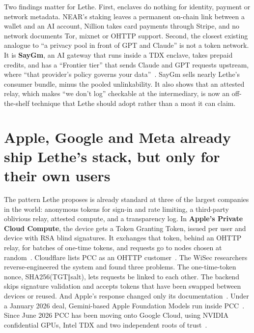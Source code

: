 \documentclass[10pt,a4paper]{article}
\begin{document}
Two findings matter for Lethe. First, enclaves do nothing for identity, payment or network metadata. NEAR's staking leaves a permanent on-chain link between a wallet and an AI account, Nillion takes card payments through Stripe, and no network documents Tor, mixnet or OHTTP support. Second, the closest existing analogue to ``a privacy pool in front of GPT and Claude'' is not a token network. It is \textbf{SayGm}, an AI gateway that runs inside a TDX enclave, takes prepaid credits, and has a ``Frontier tier'' that sends Claude and GPT requests upstream, where ``that provider's policy governs your data''~\cite{near-ai-blog-saygm}. SayGm sells nearly Lethe's consumer bundle, minus the pooled unlinkability. It also shows that an attested relay, which makes ``we don't log'' checkable at the intermediary, is now an off-the-shelf technique that Lethe should adopt rather than a moat it can claim.

\section{Apple, Google and Meta already ship Lethe's stack, but only for their own users}

The pattern Lethe proposes is already standard at three of the largest companies in the world: anonymous tokens for sign-in and rate limiting, a third-party oblivious relay, attested compute, and a transparency log. In \textbf{Apple's Private Cloud Compute}, the device gets a Token Granting Token, issued per user and device with RSA blind signatures. It exchanges that token, behind an OHTTP relay, for batches of one-time tokens, and requests go to nodes chosen at random~\cite{wisec-2026-arxiv-2605}. Cloudflare lists PCC as an OHTTP customer~\cite{cloudflare-blog-ohttp-gate}. The WiSec researchers reverse-engineered the system and found three problems. The one-time-token nonce, SHA256(TGT$\Vert$salt), lets requests be linked to each other. The backend skips signature validation and accepts tokens that have been swapped between devices or reused. And Apple's response changed only its documentation~\cite{wisec-2026-arxiv-2605}. Under a January 2026 deal, Gemini-based Apple Foundation Models run inside PCC~\cite{9to5mac-gemini-and-pcc}. Since June 2026 PCC has been moving onto Google Cloud, using NVIDIA confidential GPUs, Intel TDX and two independent roots of trust~\cite{apple-security-research-ex}.
\end{document}
